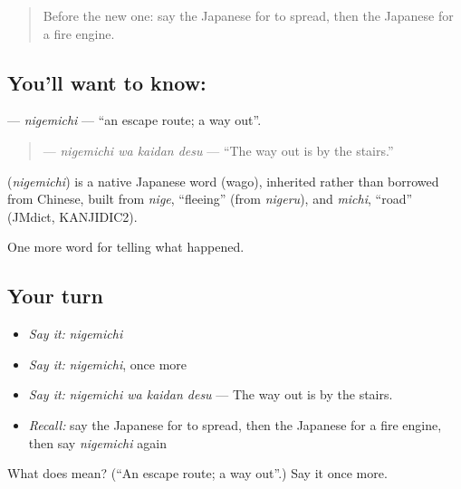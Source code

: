 \begin{quote}
Before the new one: say the Japanese for to spread, then the Japanese for a fire engine.
\end{quote}

\subsection*{You'll want to know: }
\textbf{} — \emph{nigemichi} — \textquotedblleft{}an escape route; a way out\textquotedblright{}.

\begin{quote}
\textbf{ } — \emph{nigemichi wa kaidan desu} — \textquotedblleft{}The way out is by the stairs.\textquotedblright{}
\end{quote}

\begin{cousinweb}
\textbf{} (\emph{nigemichi}) is a native Japanese word (wago), inherited rather than borrowed from Chinese, built from \emph{nige}, \textquotedblleft{}fleeing\textquotedblright{} (from \emph{nigeru}), and \emph{michi}, \textquotedblleft{}road\textquotedblright{} (JMdict, KANJIDIC2).
\end{cousinweb}

\begin{grammarlens}[title={What you've built}]
One more word for telling what happened.
\end{grammarlens}

\subsection*{Your turn}
\begin{itemize}
\raggedright
  \item \emph{Say it:} \emph{nigemichi}
  \item \emph{Say it:} \emph{nigemichi}, once more
  \item \emph{Say it:} \emph{nigemichi wa kaidan desu} — The way out is by the stairs.
  \item \emph{Recall:} say the Japanese for to spread, then the Japanese for a fire engine, then say \emph{nigemichi} again
\end{itemize}

\begin{tcolorbox}[breakable,colback=teal!4,colframe=teal!35!black,title={Before you move on}]
What does  mean? (\textquotedblleft{}An escape route; a way out\textquotedblright{}.) Say it once more.
\end{tcolorbox}
